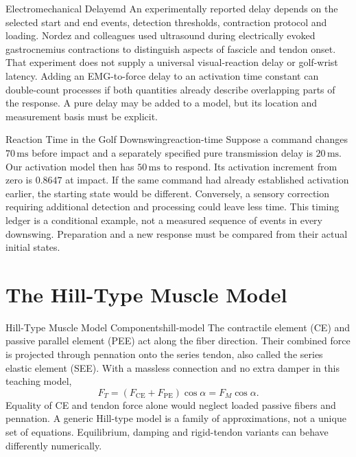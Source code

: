 \begin{definition}{Electromechanical Delay}{emd}
An experimentally reported delay depends on the selected start and end events, detection thresholds, contraction protocol and loading. Nordez and colleagues used ultrasound during electrically evoked gastrocnemius contractions to distinguish aspects of fascicle and tendon onset. That experiment does not supply a universal visual-reaction delay or golf-wrist latency. \citep{Nordez2009Delay} Adding an EMG-to-force delay to an activation time constant can double-count processes if both quantities already describe overlapping parts of the response. A pure delay may be added to a model, but its location and measurement basis must be explicit.
\end{definition}

\begin{example}{Reaction Time in the Golf Downswing}{reaction-time}
Suppose a command changes $70\,\mathrm{ms}$ before impact and a separately specified pure transmission delay is $20\,\mathrm{ms}$. Our activation model then has $50\,\mathrm{ms}$ to respond. Its activation increment from zero is $0.8647$ at impact. If the same command had already established activation earlier, the starting state would be different. Conversely, a sensory correction requiring additional detection and processing could leave less time. This timing ledger is a conditional example, not a measured sequence of events in every downswing. Preparation and a new response must be compared from their actual initial states.
\end{example}

\section{The Hill-Type Muscle Model}

\begin{definition}{Hill-Type Muscle Model Components}{hill-model}
The contractile element (CE) and passive parallel element (PEE) act along the fiber direction. Their combined force is projected through pennation onto the series tendon, also called the series elastic element (SEE). With a massless connection and no extra damper in this teaching model,
\begin{equation}
F_T=(F_{\mathrm{CE}}+F_{\mathrm{PE}})\cos\alpha=F_M\cos\alpha.
\label{eq:total-hill}
\end{equation}
Equality of CE and tendon force alone would neglect loaded passive fibers and pennation. A generic Hill-type model is a family of approximations, not a unique set of equations. Equilibrium, damping and rigid-tendon variants can behave differently numerically. \citep{millard2013flexing}
\end{definition}


